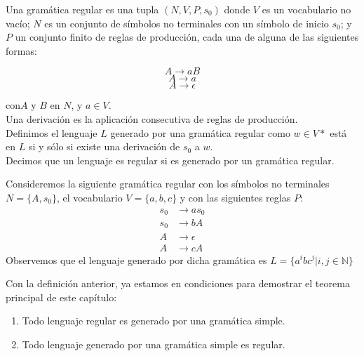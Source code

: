 \documentclass[../main.tex]{subfiles}
\begin{document}
 \begin{dfn}
 	
 	Una gramática regular es una tupla $(N,V,P,s_0)$ donde $V$ es un vocabulario no vacío; $N$ es un conjunto de símbolos no terminales con un símbolo de inicio $s_0$; y $P$ un conjunto finito de reglas de producción, cada una de alguna de las siguientes formas:
 	
 	$$A \to aB$$
 	$$A \to a$$
 	$$A \to \epsilon$$
 	
 	con$A$ y $B$ en $N$, y $a \in V$. \\
 	Una derivación es la aplicación consecutiva de reglas de producción. \\
 	Definimos el lenguaje $L$ generado por una gramática regular como $w\in V*$ está en $L$ si y sólo si existe una derivación de $s_0$ a $w$. \\
 	Decimos que un lenguaje es regular si es generado por un gramática regular.
 \end{dfn}
 
 \begin{ej}
 	Consideremos la siguiente gramática regular con los símbolos no terminales $N= \{A, s_0\}$, el vocabulario $V=\{a, b, c\}$ y con las siguientes reglas $P$:
 	\begin{align*}
		s_0 &\to as_0 \\
		s_0 &\to bA \\
		A &\to \epsilon \\
		A &\to cA
 	\end{align*} 
 	Observemos que el lenguaje generado por dicha gramática es $L=\{ a^i b c^j|i, j \in \mathbb{N} \}$  
 \end{ej}
 
 Con la definición anterior, ya estamos en condiciones para demostrar el teorema principal de este capítulo:
 
 
 \begin{thm}
	\begin{enumerate}[label=(\alph*)]
 		\item Todo lenguaje regular es generado por una gramática simple.
 		\item Todo lenguaje generado por una gramática simple es regular.
 \end{enumerate}	

 \end{thm}
 
\end{document}
